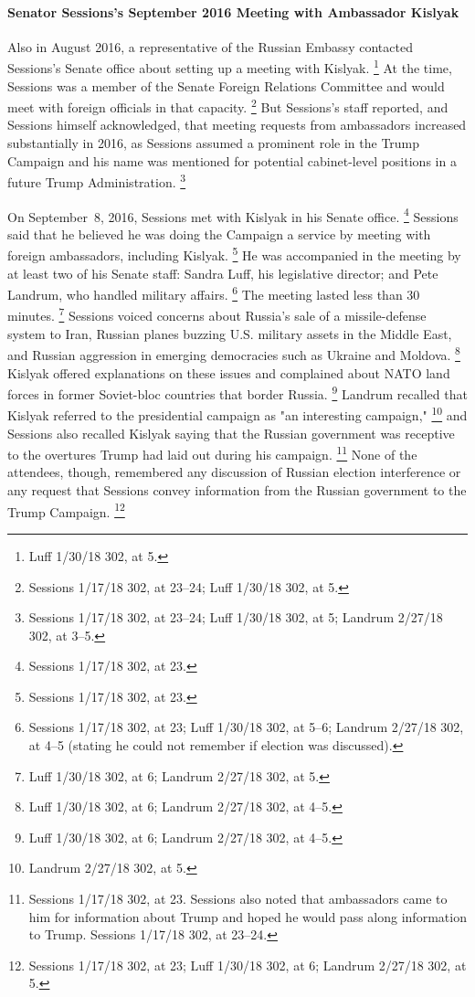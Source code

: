 \paragraph{Senator Sessions's September 2016 Meeting with Ambassador Kislyak}

Also in August 2016, a representative of the Russian Embassy contacted Sessions's Senate office about setting up a meeting with Kislyak.%
\footnote{Luff 1/30/18 302, at 5.}
At the time, Sessions was a member of the Senate Foreign Relations Committee and would meet with foreign officials in that capacity.%
\footnote{Sessions 1/17/18 302, at 23--24;
Luff 1/30/18 302, at 5.}
But Sessions's staff reported, and Sessions himself acknowledged, that meeting requests from ambassadors increased substantially in 2016, as Sessions assumed a prominent role in the Trump Campaign and his name was mentioned for potential cabinet-level positions in a future Trump Administration.%
\footnote{Sessions 1/17/18 302, at 23--24;
Luff 1/30/18 302, at 5;
Landrum 2/27/18 302, at 3--5.}

On September~8, 2016, Sessions met with Kislyak in his Senate office.%
\footnote{Sessions 1/17/18 302, at 23.}
Sessions said that he believed he was doing the Campaign a service by meeting with foreign ambassadors, including Kislyak.%
\footnote{Sessions 1/17/18 302, at 23.}
He was accompanied in the meeting by at least two of his Senate staff: Sandra Luff, his legislative director; and Pete Landrum, who handled military affairs.%
\footnote{Sessions 1/17/18 302, at 23;
Luff 1/30/18 302, at 5--6;
Landrum 2/27/18 302, at 4--5 (stating he could not remember if election was discussed).}
The meeting lasted less than 30 minutes.%
\footnote{Luff 1/30/18 302, at 6;
Landrum 2/27/18 302, at 5.}
Sessions voiced concerns about Russia's sale of a missile-defense system to Iran, Russian planes buzzing U.S. military assets in the Middle East, and Russian aggression in emerging democracies such as Ukraine and Moldova.%
\footnote{Luff 1/30/18 302, at 6;
Landrum 2/27/18 302, at 4--5.}
Kislyak offered explanations on these issues and complained about NATO land forces in former Soviet-bloc countries that border Russia.%
\footnote{Luff 1/30/18 302, at 6;
Landrum 2/27/18 302, at 4--5.}
Landrum recalled that Kislyak referred to the presidential campaign as "an interesting campaign,"%
\footnote{Landrum 2/27/18 302, at 5.}
and Sessions also recalled Kislyak saying that the Russian government was receptive to the overtures Trump had laid out during his campaign.%
\footnote{Sessions 1/17/18 302, at 23.
Sessions also noted that ambassadors came to him for information about Trump and hoped he would pass along information to Trump.
Sessions 1/17/18 302, at 23--24.}
None of the attendees, though, remembered any discussion of Russian election interference or any request that Sessions convey information from the Russian government to the Trump Campaign.%
\footnote{Sessions 1/17/18 302, at 23;
Luff 1/30/18 302, at 6;
Landrum 2/27/18 302, at 5.}

